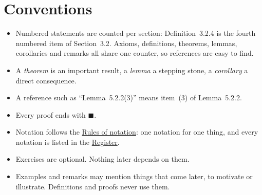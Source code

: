 \section*{Conventions}

\begin{itemize}
  \item Numbered statements are counted per section: Definition~3.2.4 is the
    fourth numbered item of Section~3.2. Axioms, definitions, theorems, lemmas,
    corollaries and remarks all share one counter, so references are easy to
    find.
  \item A \emph{theorem} is an important result, a \emph{lemma} a stepping
    stone, a \emph{corollary} a direct consequence.
  \item A reference such as \enquote{Lemma~5.2.2(3)} means item~(3) of Lemma~5.2.2.
  \item Every proof ends with $\blacksquare$.
  \item Notation follows the \hyperref[rules]{Rules of notation}: one notation
    for one thing, and every notation is listed in the
    \hyperref[register]{Register}.
  \item Exercises are optional. Nothing later depends on them.
  \item Examples and remarks may mention things that come later, to motivate or
    illustrate. Definitions and proofs never use them.
\end{itemize}
